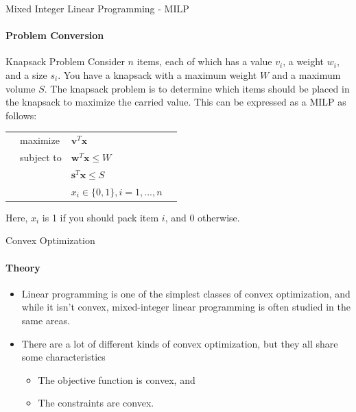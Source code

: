 \documentclass{beamer}
\renewcommand{\vec}{\mathbf}
\begin{document}
	\begin{frame}{Mixed Integer Linear Programming - MILP}
		\framesubtitle{Problem Conversion}
		\begin{block}{Knapsack Problem}
			Consider $n$ items, each of which has a value $v_i$, a weight $w_i$, and a size $s_i$. You have a knapsack with a maximum weight $W$ and a maximum volume $S$. The knapsack problem is to determine which items should be placed in the knapsack to maximize the carried value. This can be expressed as a MILP as follows:
			\begin{tabularx}{\textwidth}{X l l X}
				& maximize		& $\vec{v}^T\vec{x}$	& \\
				& subject to	& $\vec{w}^T\vec{x} \leq W$	& \\
				& 				& $\vec{s}^T\vec{x} \leq S$ & \\
				& 				& $x_i\in\{0,1\}, i=1,...,n$ &
			\end{tabularx}
			Here, $x_i$ is 1 if you should pack item $i$, and 0 otherwise.
		\end{block}
	\end{frame}
%	
%	
	\begin{frame}{Convex Optimization}
		\framesubtitle{Theory}
		\begin{itemize}
			\item Linear programming is one of the simplest classes of convex optimization, and while it isn't convex, mixed-integer linear programming is often studied in the same areas.
			\item There are a lot of different kinds of convex optimization, but they all share some characteristics
			\begin{itemize}
				\item The objective function is convex, and
				\item The constraints are convex.
			\end{itemize}
		\end{itemize}
	\end{frame}
\end{document}
